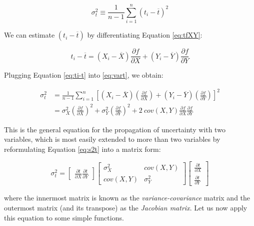\documentclass{book}
\begin{document}
\begin{equation}
\sigma^2_t \equiv \frac{1}{n-1} \sum_{i=1}^{n} (t_i-\overline{t})^2
\label{eq:vart}
\end{equation}

We can estimate $(t_i-\overline{t})$ by differentiating Equation
\ref{eq:tfXY}:

\begin{equation}
t_i - \overline{t} = (X_i-\overline{X}) \frac{\partial f}{\partial X} +
(Y_i-\overline{Y}) \frac{\partial f}{\partial Y}
\label{eq:ti-t}
\end{equation}

Plugging Equation \ref{eq:ti-t} into \ref{eq:vart}, we obtain:

\begin{align}
\sigma^2_t & = \frac{1}{n-1} \sum_{i=1}^{n} \left[
(X_i-\overline{X}) \left(\frac{\partial f}{\partial X}\right) +
(Y_i-\overline{Y}) \left(\frac{\partial f}{\partial Y}\right) \right]^2 \label{eq:s2t1}\\
~ & = \sigma^2_X \left(\frac{\partial f}{\partial X}\right)^2 +
\sigma^2_Y \left(\frac{\partial f}{\partial Y}\right)^2 +
2~cov(X,Y) \frac{\partial f}{\partial X} \frac{\partial f}{\partial Y} \label{eq:s2t}
\end{align}

This is the general equation for the propagation of uncertainty with
two variables, which is most easily extended to more than two
variables by reformulating Equation \ref{eq:s2t} into a matrix form:

\begin{equation}
\sigma_t^2 = 
\left[
\begin{array}{cc}
\frac{\partial t}{\partial X} \frac{\partial t}{\partial Y}
\end{array}
\right]
\left[
\begin{array}{cc}
\sigma_X^2 & cov(X,Y)\\
cov(X,Y) & \sigma_Y^2
\end{array}
\right]
\left[
\begin{array}{c}
\frac{\partial t}{\partial X} \\
\frac{\partial t}{\partial Y}
\end{array}
\right]
\label{eq:s2tmatrix}
\end{equation}

where the innermost matrix is known as the \emph{variance-covariance}
matrix and the outermost matrix (and its transpose) as the
\emph{Jacobian matrix}.  Let us now apply this equation to some simple
functions.
\end{document}
